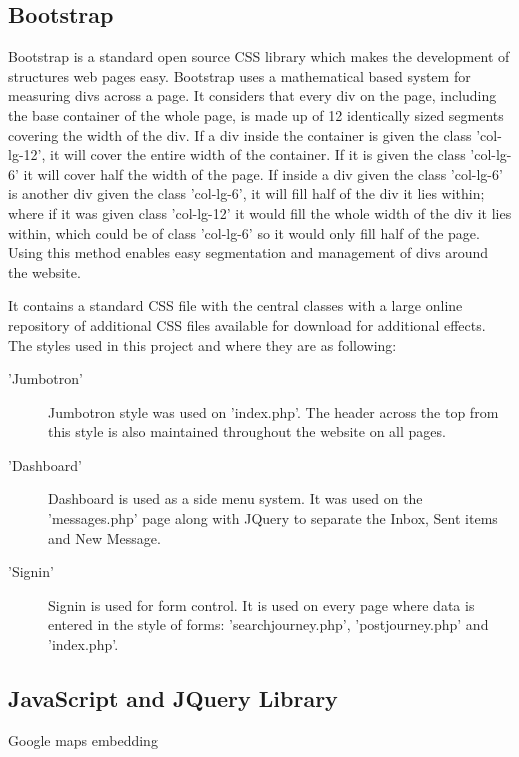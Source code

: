 	\subsection{Bootstrap}
		Bootstrap\cite{bootstrap_library} is a standard open source CSS library which makes the development of structures web pages easy. Bootstrap uses a mathematical based system for measuring divs across a page. It considers that every div on the page, including the base container of the whole page, is made up of 12 identically sized segments covering the width of the div. If a div inside the container is given the class 'col-lg-12', it will cover the entire width of the container. If it is given the class 'col-lg-6' it will cover half the width of the page. If inside a div given the class 'col-lg-6' is another div given the class 'col-lg-6', it will fill half of the div it lies within; where if it was given class 'col-lg-12' it would fill the whole width of the div it lies within, which could be of class 'col-lg-6' so it would only fill half of the page. Using this method enables easy segmentation and management of divs around the website.
		
		It contains a standard CSS file with the central classes with a large online repository of additional CSS files available for download for additional effects. The styles used in this project and where they are as following:
		\begin{description}
		\item['Jumbotron'] Jumbotron style was used on 'index.php'. The header across the top from this style is also maintained throughout the website on all pages.
		\item['Dashboard'] Dashboard is used as a side menu system. It was used on the 'messages.php' page along with JQuery to separate the Inbox, Sent items and New Message.
		\item['Signin'] Signin is used for form control. It is used on every page where data is entered in the style of forms: 'search\textunderscore journey.php', 'post\textunderscore journey.php' and 'index.php'.
		\end{description}
	\subsection{JavaScript and JQuery Library}
	Google maps embedding





